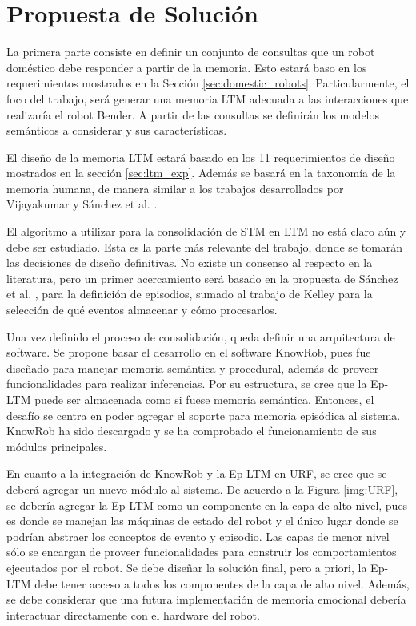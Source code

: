 \section{Propuesta de Solución}

%

La primera parte consiste en definir un conjunto de consultas que un robot doméstico debe responder a partir de la memoria. Esto estará baso en los requerimientos mostrados en la Sección \ref{sec:domestic_robots}. Particularmente, el foco del trabajo, será generar una memoria LTM adecuada a las interacciones que realizaría el robot Bender. A partir de las consultas se definirán los modelos semánticos a considerar y sus características. 

El diseño de la memoria LTM estará basado en los 11 requerimientos de diseño mostrados en la sección \ref{sec:ltm_exp}. Además se basará en la taxonomía de la memoria humana, de manera similar a los trabajos desarrollados por Vijayakumar  \cite{Vijayakumar2014} y Sánchez et al. \cite{Sanchez:2015}.

El algoritmo a utilizar para la consolidación de STM en LTM no está claro aún y debe ser estudiado. Esta es la parte más relevante del trabajo, donde se tomarán las decisiones de diseño definitivas. No existe un consenso al respecto en la literatura, pero un primer acercamiento será basado en la propuesta de Sánchez et al.  \cite{Sanchez:2015}, para la definición de episodios, sumado al trabajo de Kelley  \cite{Kelley2014} para la selección de qué eventos almacenar y cómo procesarlos.

Una vez definido el proceso de consolidación, queda definir una arquitectura de software. Se propone basar el desarrollo en el software KnowRob, pues fue diseñado para manejar memoria semántica y procedural, además de proveer funcionalidades para realizar inferencias. Por su estructura, se cree que la Ep-LTM puede ser almacenada como si fuese memoria semántica. Entonces, el desafío se centra en poder agregar el soporte para memoria episódica al sistema. KnowRob ha sido descargado y se ha comprobado el funcionamiento de sus módulos principales.

En cuanto a la integración de KnowRob y la Ep-LTM en URF, se cree que se deberá agregar un nuevo módulo al sistema. De acuerdo a la Figura \ref{img:URF}, se debería agregar la Ep-LTM como un componente en la capa de alto nivel, pues es donde se manejan las máquinas de estado del robot y el único lugar donde se podrían abstraer los conceptos de evento y episodio. Las capas de menor nivel sólo se encargan de proveer funcionalidades para construir los comportamientos ejecutados por el robot. Se debe diseñar la solución final, pero a priori, la Ep-LTM debe tener acceso a todos los componentes de la capa de alto nivel. Además, se debe considerar que una futura implementación de memoria emocional debería interactuar directamente con el hardware del robot. 


